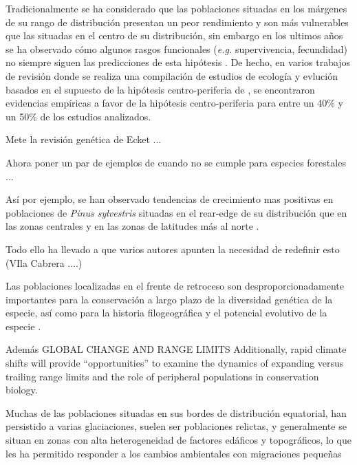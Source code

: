 Tradicionalmente se ha considerado que las poblaciones situadas en los márgenes de su rango de distribución presentan un peor rendimiento y son más vulnerables que las situadas en el centro de su distribución, sin embargo en los ultimos años se ha observado cómo algunos rasgos funcionales (\emph{e.g.} supervivencia, fecundidad) no siempre siguen las predicciones de esta hipótesis \autocite{Pirononetal2017GeographicVariation}. De hecho, en varios trabajos de revisión donde se realiza una compilación de estudios de ecología y evlución basados en el supuesto de la hipótesis centro-periferia de \autocites{SagarinGaines2002AbundantCentre,Pirononetal2017GeographicVariation}, se encontraron evidencias empíricas a favor de la hipótesis centro-periferia para entre un 40\% y un 50\% de los estudios analizados. 

Mete la revisión genética de Ecket 
...

Ahora poner un par de ejemplos de cuando no se cumple para especies forestales ... 


Así por ejemplo, se han observado tendencias de crecimiento mas positivas en poblaciones de \emph{Pinus sylvestris} situadas en el rear-edge de su distribución que en las zonas centrales y en las zonas de latitudes más al norte \autocite{Matiasetal2017ContrastingGrowth}. 


Todo ello ha llevado a que varios autores apunten la necesidad de redefinir esto (VIla Cabrera ....) 


Las poblaciones localizadas en el frente de retroceso \autocite[\textit{rear-edge, sensu} ][]{HampePetit2005ConservingBiodiversity} son desproporcionadamente importantes para la conservación a largo plazo de la diversidad genética de la especie, así como para la historia filogeográfica y el potencial evolutivo de la especie \autocite[][]{HampePetit2005ConservingBiodiversity}.  

Además 
GLOBAL CHANGE AND RANGE LIMITS
Additionally, rapid climate shifts will provide “opportunities” to examine the dynamics of expanding versus trailing range limits and the role of peripheral populations in conservation biology.




Muchas de las poblaciones situadas en sus bordes de distribución equatorial, han persistido a varias glaciaciones, suelen ser poblaciones relictas, y generalmente se situan en zonas con alta heterogeneidad de factores edáficos y topográficos, lo que les ha permitido responder a los cambios ambientales con migraciones pequeñas 


